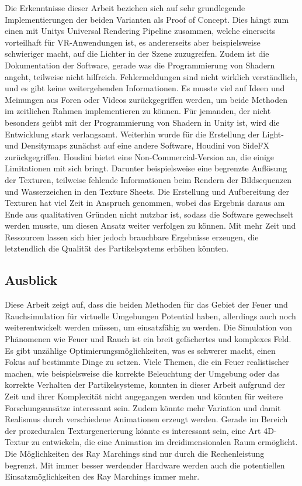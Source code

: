 Die Erkenntnisse dieser Arbeit beziehen sich auf sehr grundlegende Implementierungen der beiden Varianten als Proof of Concept. Dies hängt zum einen mit 
Unitys Universal Rendering Pipeline zusammen, welche einerseits vorteilhaft für VR-Anwendungen ist, es andererseits aber beispielsweise schwieriger macht,
auf die Lichter in der Szene zuzugreifen. Zudem ist die Dokumentation der Software, gerade was die Programmierung von Shadern angeht, teilweise nicht hilfreich.
Fehlermeldungen sind nicht wirklich verständlich, und es gibt keine weitergehenden Informationen.
Es musste viel auf Ideen und Meinungen aus Foren oder Videos zurückgegriffen werden, um beide Methoden im zeitlichen Rahmen implementieren zu können.
Für jemanden, der nicht besonders geübt mit der Programmierung von Shadern in Unity ist, wird die Entwicklung stark verlangsamt. 
Weiterhin wurde für die Erstellung der Light- und Densitymaps zunächst auf eine andere Software, Houdini von SideFX zurückgegriffen.
Houdini bietet eine Non-Commercial-Version an, die einige Limitationen mit sich bringt. Darunter beispielsweise eine begrenzte Auflösung der Texturen, 
teilweise fehlende Informationen beim Rendern der Bildsequenzen und Wasserzeichen in den Texture Sheets. Die Erstellung und Aufbereitung der Texturen hat viel Zeit
in Anspruch genommen, wobei das Ergebnis daraus am Ende aus qualitativen Gründen nicht nutzbar ist, sodass die Software gewechselt werden musste, um diesen Ansatz 
weiter verfolgen zu können. Mit mehr Zeit und Ressourcen lassen sich hier jedoch brauchbare Ergebnisse erzeugen, die letztendlich die Qualität des 
Partikelsystems erhöhen könnten. 



\subsection{Ausblick}
\label{sec:6.3}
Diese Arbeit zeigt auf, dass die beiden Methoden für das Gebiet der Feuer und Rauchsimulation für virtuelle Umgebungen Potential haben, allerdings auch noch 
weiterentwickelt werden müssen, um einsatzfähig zu werden.   
Die Simulation von Phänomenen wie Feuer und Rauch ist ein breit gefächertes und komplexes Feld. 
Es gibt unzählige Optimierungsmöglichkeiten, was es schwerer macht, einen Fokus auf
bestimmte Dinge zu setzen. Viele Themen, die ein Feuer realistischer machen, wie beispielsweise die korrekte Beleuchtung der Umgebung oder das 
korrekte Verhalten der Partikelsysteme, konnten in dieser Arbeit aufgrund der Zeit und ihrer Komplexität nicht angegangen werden und könnten für 
weitere Forschungsansätze interessant sein. Zudem könnte mehr Variation und damit Realismus durch verschiedene Animationen erzeugt werden. 
Gerade im Bereich der prozeduralen Texturgenerierung könnte es interessant sein, eine Art 4D-Textur zu entwickeln, die eine Animation im dreidimensionalen
Raum ermöglicht. 
Die Möglichkeiten des Ray Marchings sind nur durch die Rechenleistung begrenzt. Mit immer besser werdender Hardware werden auch die potentiellen 
Einsatzmöglichkeiten des Ray Marchings immer mehr.


\newpage
